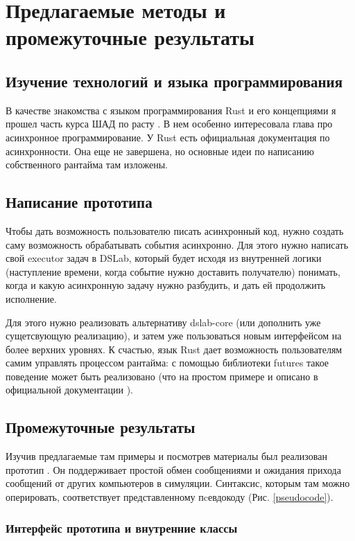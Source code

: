 \newpage
\section{Предлагаемые методы и промежуточные результаты} 

\subsection{Изучение технологий и языка программирования}
В качестве знакомства с языком программирования Rust и его концепциями я прошел часть курса ШАД по расту \cite{shad-rust}. В нем особенно интересовала глава про асинхронное программирование. У Rust есть официальная документация по асинхронности\cite{async-book}. Она еще не завершена, но основные идеи по написанию собственного рантайма там изложены.


\subsection{Написание прототипа}
Чтобы дать возможность пользователю писать асинхронный код, нужно создать саму возможность обрабатывать события асинхронно. Для этого нужно написать свой executor задач в DSLab, который будет исходя из внутренней логики (наступление времени, когда событие нужно доставить получателю) понимать, когда и какую асинхронную задачу нужно разбудить, и дать ей продолжить исполнение. 

Для этого нужно реализовать альтернативу dslab-core (или дополнить уже сущетсвующую реализацию), и затем уже пользоваться новым интерфейсом на более верхних уровнях. К счастью, язык Rust дает возможность пользователям самим управлять процессом рантайма: с помощью библиотеки futures \cite{rust-futures} такое поведение может быть реализовано (что на простом примере и описано в официальной документации \cite{async-book}).

\subsection{Промежуточные результаты}

Изучив предлагаемые там примеры и посмотрев материалы был реализован прототип \cite{my-demo}. Он поддерживает простой обмен сообщениями и ожидания прихода сообщений от других компьютеров в симуляции. Синтаксис, которым там можно оперировать, соответствует представленному пcевдокоду (Рис. \ref{pseudocode}). 

\subsubsection{Интерфейс прототипа и внутренние классы}

